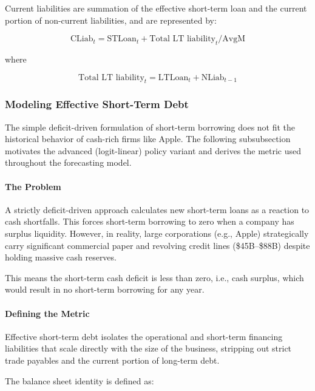 \documentclass[12pt,a4paper]{article}
\begin{document}
Current liabilities are summation of the effective short-term loan and
the current portion of non-current liabilities, and are represented by:

\begin{equation}\label{eq:cliab}
\text{CLiab}_t = \text{STLoan}_t + \text{Total LT liability}_t / \text{AvgM}
\end{equation}

where

\begin{equation}\label{eq:total_lt_liability}
\text{Total LT liability}_t = \text{LTLoan}_t + \text{NLiab}_{t-1}
\end{equation}

\subsubsection{Modeling Effective Short-Term Debt}

The simple deficit-driven formulation of short-term borrowing does not
fit the historical behavior of cash-rich firms like Apple. The
following subsubsection motivates the advanced (logit-linear) policy
variant and derives the metric used throughout the forecasting model.

\paragraph{The Problem}

A strictly deficit-driven approach calculates new short-term loans as a
reaction to cash shortfalls. This forces short-term borrowing to zero
when a company has surplus liquidity. However, in reality, large
corporations (e.g., Apple) strategically carry significant commercial
paper and revolving credit lines (\$45B--\$88B) despite holding massive
cash reserves.

This means the short-term cash deficit is less than zero, i.e., cash surplus, which would result in no short-term borrowing for any year.


\paragraph{Defining the Metric}

Effective short-term debt isolates the operational and short-term
financing liabilities that scale directly with the size of the business,
stripping out strict trade payables and the current portion of long-term
debt.

The balance sheet identity is defined as:
\end{document}
